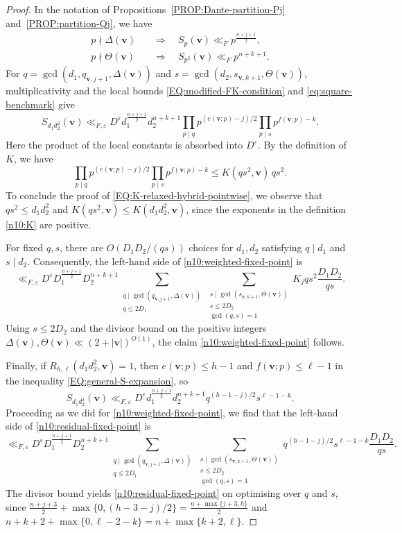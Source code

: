 \documentclass[a4paper,11pt, twoside,reqno]{amsart}
\theoremstyle{plain}
\theoremstyle{definition}
\theoremstyle{remark}
\newcommand{\bfv}{\bm{v}}
\newcommand{\ve}{\varepsilon}
\renewcommand{\le}{\leqslant}
\numberwithin{equation}{section}
\begin{document}
\begin{proof}
In the notation of Propositions~\ref{PROP:Dante-partition-Pj}
and~\ref{PROP:partition-Qj}, we have
\[
\begin{aligned}
p\nmid\Delta(\bfv)
&\quad\Longrightarrow\quad
S_p(\bfv)\ll_F p^{\frac{n+j+1}{2}},\\
p\nmid\Theta(\bfv)
&\quad\Longrightarrow\quad
S_{p^2}(\bfv)\ll_F p^{n+k+1}.
\end{aligned}
\]
For $q=\gcd(d_1,q_{\bfv,j+1},\Delta(\bfv))$
and $s=\gcd(d_2,s_{\bfv,k+1},\Theta(\bfv))$,
multiplicativity
and the local bounds \eqref{EQ:modified-FK-condition} and \eqref{eq:square-benchmark}
give
\begin{equation}
\label{EQ:general-S-expansion}
S_{d_1d_2^2}(\bfv)
\ll_{F,\ve}
D^\ve d_1^{\frac{n+j+1}{2}}d_2^{n+k+1}
\prod_{p\mid q}p^{(e(\bfv;p)-j)/2}
\prod_{p\mid s}p^{f(\bfv;p)-k}.
\end{equation}
Here the product of the local constants is absorbed into
$D^\ve$. By the definition of $K$, we have
\[
\prod_{p\mid q}p^{(e(\bfv;p)-j)/2}
\prod_{p\mid s}p^{f(\bfv;p)-k}
\le
K(qs^2,\bfv)\,qs^2.
\]
To conclude the proof of \eqref{EQ:K-relaxed-hybrid-pointwise},
we observe that $qs^2 \le d_1d_2^2$ and
$K(qs^2,\bfv) \le K(d_1d_2^2,\bfv)$,
since the exponents in the definition \eqref{n10:K} are positive.

For fixed $q,s$, there are
$O(D_1D_2/(qs))$ choices for $d_1,d_2$ satisfying
$q\mid d_1$ and $s\mid d_2$.
Consequently, the left-hand side of \eqref{n10:weighted-fixed-point} is
\[
\ll_{F,\ve}
D^\ve D_1^{\frac{n+j+1}{2}}D_2^{n+k+1}
\sum_{\substack{q\mid \gcd(q_{\bfv,j+1},\Delta(\bfv))\\q\le2D_1}}
\sum_{\substack{
s\mid \gcd(s_{\bfv,k+1},\Theta(\bfv))\\s\le2D_2\\\gcd(q,s)=1}}
K_j qs^2 \frac{D_1D_2}{qs}.
\]
Using $s\le 2D_2$ and the divisor bound on the positive integers
$\Delta(\bfv),\Theta(\bfv) \ll (2+|\bfv|)^{O(1)}$,
the claim \eqref{n10:weighted-fixed-point} follows.

Finally, if $R_{h,\ell}(d_1d_2^2,\bfv) = 1$,
then $e(\bfv;p)\le h-1$ and $f(\bfv;p)\le \ell-1$
in the inequality \eqref{EQ:general-S-expansion},
so
\begin{equation*}
S_{d_1d_2^2}(\bfv)
\ll_{F,\ve}
D^\ve d_1^{\frac{n+j+1}{2}}d_2^{n+k+1}
q^{(h-1-j)/2} s^{\ell-1-k}.
\end{equation*}
Proceeding as we did for \eqref{n10:weighted-fixed-point},
we find that the left-hand side of \eqref{n10:residual-fixed-point} is
\[
\ll_{F,\ve}
D^\ve D_1^{\frac{n+j+1}{2}}D_2^{n+k+1}
\sum_{\substack{q\mid \gcd(q_{\bfv,j+1},\Delta(\bfv))\\q\le2D_1}}
\sum_{\substack{
s\mid \gcd(s_{\bfv,k+1},\Theta(\bfv))\\s\le2D_2\\\gcd(q,s)=1}}
q^{(h-1-j)/2} s^{\ell-1-k} \frac{D_1D_2}{qs}.
\]
The divisor bound
yields
\eqref{n10:residual-fixed-point} on optimising over $q$ and $s$,
since $\frac{n+j+3}{2} + \max\{0,(h-3-j)/2\}
= \frac{n+\max\{j+3,h\}}{2}$
and $n+k+2 + \max\{0,\ell-2-k\}
= n + \max\{k+2,\ell\}$.
\end{proof}
\end{document}
